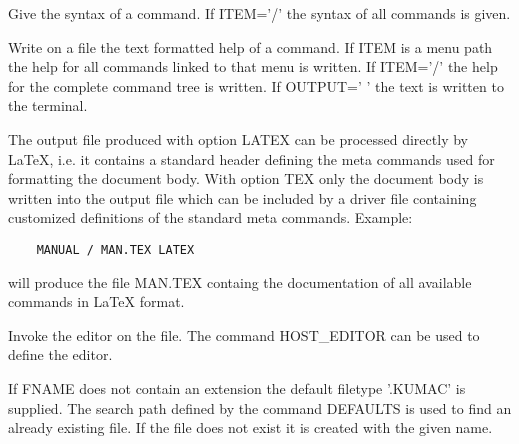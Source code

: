 \ENDCMD


\BEGARG
{}
\ENDARG

   \par
Give the syntax of a command.  If ITEM='/' the syntax of all commands is 
   given.  

\ENDCMD


\BEGARG
{}
\ENDARG
{}
\ENDOPT

   \par
Write on a file the text formatted help of a command.  If ITEM is a menu 
   path the help for all commands linked to that menu is written.  If ITEM='/' 
   the help for the complete command tree is written.  If OUTPUT=' ' the text 
   is written to the terminal.  

   \par
The output file produced with option LATEX can be processed directly by 
   LaTeX, i.e. it contains a standard header defining the meta commands used 
   for formatting the document body.  With option TEX only the document body 
   is written into the output file which can be included by a driver file 
   containing customized definitions of the standard meta commands.  Example:  
\begin{verbatim}
    MANUAL / MAN.TEX LATEX
\end{verbatim}
   \par
will produce the file MAN.TEX containg the documentation of all available 
   commands in LaTeX format.  

\ENDCMD


\BEGARG
{}
\ENDARG

   \par
Invoke the editor on the file.  The command HOST\_EDITOR can be used to 
   define the editor.  

   \par
If FNAME does not contain an extension the default filetype '.KUMAC' is 
   supplied.  The search path defined by the command DEFAULTS is used to find 
   an already existing file.  If the file does not exist it is created with 
   the given name.  

